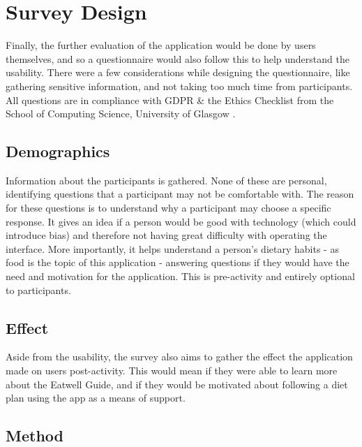 \documentclass[../main.tex]{subfiles}
\begin{document}
\section{Survey Design}

Finally, the further evaluation of the application would be done by users themselves, and so a questionnaire would also follow this to help understand the usability. There were a few considerations while designing the questionnaire, like gathering sensitive information, and not taking too much time from participants. All questions are in compliance with GDPR \& the Ethics Checklist from the School of Computing Science, University of Glasgow \cite{socsEthics}.

\subsection{Demographics}

Information about the participants is gathered. None of these are personal, identifying questions that a participant may not be comfortable with. The reason for these questions is to understand why a participant may choose a specific response. It gives an idea if a person would be good with technology (which could introduce bias) and therefore not having great difficulty with operating the interface. More importantly, it helps understand a person's dietary habits - as food is the topic of this application - answering questions if they would have the need and motivation for the application. This is pre-activity and entirely optional to participants.

\subsection{Effect}

Aside from the usability, the survey also aims to gather the effect the application made on users post-activity. This would mean if they were able to learn more about the Eatwell Guide, and if they would be motivated about following a diet plan using the app as a means of support.

\subsection{Method}
\end{document}
